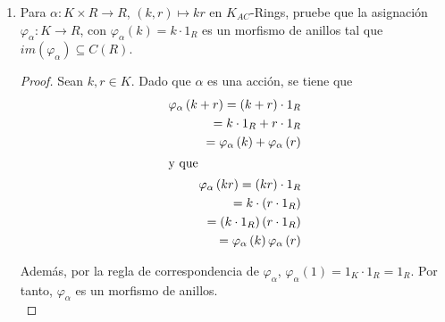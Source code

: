 \documentclass{article}
\newcommand{\lrprth}[1]{
    \left(#1\right)
}
\newcommand{\ringcenter}[1]{
    C\lrprth{#1}
}
\theoremstyle{definition}
\theoremstyle{plain}
\theoremstyle{plain}
\theoremstyle{definition}
\theoremstyle{definition}
\theoremstyle{definition}
\theoremstyle{definition}
\theoremstyle{definition}
\theoremstyle{definition}
\begin{document}
\begin{enumerate}[label=\textbf{Ej \arabic*.}]
\begin{proof}
\begin{align*}
        k\bullet_\varphi\lrprth{r_1r_2}&=\varphi(k)\lrprth{r_1r_2}\\
        &=\lrprth{\varphi(k)r_1}r_2\\
        &=\lrprth{k\bullet\varphi r_1}r_2.
        \intertext{Pero también}
        \lrprth{\varphi(k)r_1}r_2&=\lrprth{r_1\varphi(k)}r_2 && ,\ Im\lrprth{\varphi}\subseteq \ringcenter{R}\\
        &=\lrprth{k\bullet\varphi r_1}r_2.\\
        &=r_1\lrprth{\varphi(k)r_2}\\
        &=r_1\lrprth{k\bullet_\varphi r_2}.
    \end{align*}
    $\boxed{\text{(AC5)}}$ Sean $r\in R$. Así
    \begin{align*}
        1_K\bullet_\varphi r&=\varphi(1_K)r\\
        &=1_R\cdot r && ,\ \varphi\text{ es un morfismo de anillos.}\\
        \therefore & \ \lrprth{R,\bullet_\varphi}\in K_{Ac}-Rings.
    \end{align*}
    \end{proof}
    
    \item Para $\alpha : K \times R \longrightarrow R$, $\lrprth{k,r} \mapsto kr$ en $K_{AC}$-Rings, pruebe que la asignación $\varphi_{\alpha} : K \longrightarrow R$, con $\varphi_{\alpha}\lrprth{k}=k \cdot 1_{R}$ es un morfismo de anillos tal que $im\lrprth{\varphi_{\alpha}}\subseteq \ringcenter{R}$.
	\begin{proof}
		Sean $k,r \in K$. Dado que $\alpha$ es una acción, se tiene que
		\begin{align*}
			\varphi_{\alpha}\lrprth{k+r}=\lrprth{k+r}\cdot 1_{R}\\
			=k \cdot 1_{R} + r \cdot 1_{R}\\
			=\varphi_{\alpha}\lrprth{k}+\varphi_{\alpha}\lrprth{r}\\
			\intertext{y que}
			\varphi_{\alpha}\lrprth{kr}=\lrprth{kr}\cdot 1_{R}\\
			=k \cdot\lrprth{r \cdot 1_{R}}\\
			=\lrprth{k \cdot 1_{R}}\lrprth{r \cdot 1_{R}}\\
			=\varphi_{\alpha}\lrprth{k}\varphi_{\alpha}\lrprth{r}
		\end{align*}

		Además, por la regla de correspondencia de $\varphi_{\alpha}$, $\varphi_{\alpha}\lrprth{1}=1_{K} \cdot 1_{R} = 1_{R}$. Por tanto, $\varphi_{\alpha}$ es un morfismo de anillos.\\


\end{proof}
\end{enumerate}
\end{document}
